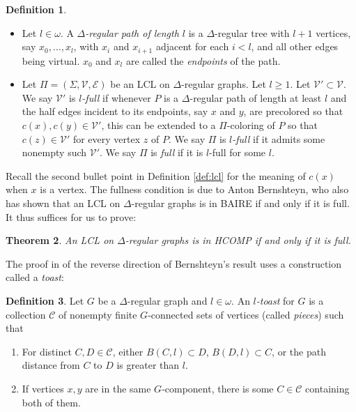 \documentclass[11pt]{amsart}
\newtheorem{theorem}{Theorem}
\theoremstyle{definition}
\newtheorem{definition}[theorem]{Definition}
\newcommand{\C}{\mathcal{C}}
\begin{document}
\begin{definition}\label{def:full}
    \begin{itemize}
        \item Let $l \in \omega$. A \textit{$\Delta$-regular path of length $l$} is a $\Delta$-regular tree with $l+1$ vertices, say $x_0,\ldots,x_l$, with $x_i$ and $x_{i+1}$ adjacent for each $i < l$, and all other edges being virtual. $x_0$ and $x_l$ are called the \textit{endpoints} of the path.
        \item Let $\Pi = (\Sigma,\mathcal{V},\mathcal{E})$ be an LCL on $\Delta$-regular graphs.  Let $l \geq 1$. Let $\mathcal{V}' \subset \mathcal{V}$. We say $\mathcal{V}'$ is \textit{$l$-full} if whenever $P$ is a $\Delta$-regular path of length at least $l$ and the half edges incident to its endpoints, say $x$ and $y$, are precolored so that $c(x),c(y) \in \mathcal{V}'$, this can be extended to a $\Pi$-coloring of $P$ so that $c(z) \in \mathcal{V}'$ for every vertex $z$ of $P$. We say $\Pi$ is \textit{$l$-full} if it admits some nonempty such $\mathcal{V}'$. We say $\Pi$ is \textit{full} if it is $l$-full for some $l$.
    \end{itemize}
\end{definition}

Recall the second bullet point in Definition \ref{def:lcl} for the meaning of $c(x)$ when $x$ is a vertex. The fullness condition is due to Anton Bernshteyn, who also has shown \cite{G+_trees} that an LCL on $\Delta$-regular graphs is in BAIRE if and only if it is full. It thus suffices for us to prove:

\begin{theorem}\label{thm:hcifffull}
    An LCL on $\Delta$-regular graphs is in HCOMP if and only if it is full.
\end{theorem}

The proof in \cite{G+_trees} of the reverse direction of Bernshteyn's result uses a construction called a \textit{toast}:

\begin{definition}\label{def:toast}
    Let $G$ be a $\Delta$-regular graph and $l \in \omega$. An \textit{$l$-toast} for $G$ is a collection $\C$ of nonempty finite $G$-connected sets of vertices (called \textit{pieces}) such that
    \begin{enumerate}
        \item For distinct $C,D \in \C$, either $B(C,l) \subset D$, $B(D,l) \subset C$, or the path distance from $C$ to $D$ is greater than $l$.
        \item If vertices $x,y$ are in the same $G$-component, there is some $C \in \C$ containing both of them.
    \end{enumerate}
\end{definition}
\end{document}
